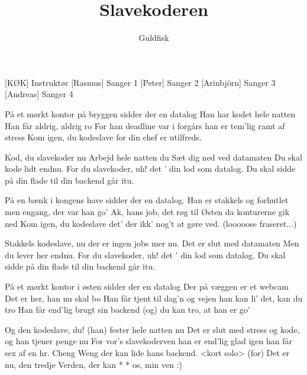 \documentclass[a4paper,11pt]{article}
\title{Slavekoderen}
\author{Guldfisk}
\begin{document}
\maketitle

\begin{roles}
  [KØK] Instruktør
  [Rasmus] Sanger 1
  [Peter] Sanger 2
  [Arinbjörn] Sanger 3
  [Andreas] Sanger 4
\end{roles}

\begin{song}
  På et mørkt kontor på bryggen
  sidder der en datalog
  Han har kodet hele natten
  Han får aldrig, aldrig ro
  For han deadline var i forgårs
  han er tem’lig ramt af stress
  Kom igen, du kodeslave
  for din chef er utilfreds.

  Kod, du slavekoder nu
  Arbejd hele natten du
  Sæt dig ned ved datamaten
  Du skal kode lidt endnu.
  For du slavekoder, uh!
  det ’ din lod som datalog.
  Du skal sidde på din flade
  til din backend går itu.

  På en bænk i kongens have
  sidder der en datalog.
  Han er stakkels og forhutlet
  men engang, der var han go'
  Ak, hans job, det røg til Østen
  da konturerne gik ned
  Kom igen, du kodeslave
  det’ der ikk’ nog’t at gøre ved. (looooose fraseret...)

  Stakkels kodeslave, nu
  der er ingen jobs mer nu.
  Det er slut med datamaten
  Men du lever her endnu.
  For du slavekoder, uh!
  det ’ din lod som datalog.
  Du skal sidde på din flade
  til din backend går itu.

  På et mørkt kontor i østen
  sidder der en datalog
  Der på væggen er et webcam
  Det er her, han nu skal bo
  Han får tjent til dag’n og vejen
  han kan li’ det, kan du tro
  Han får end’lig brugt sin backend
  (og) du kan tro, at han er go’

  Og den kodeslave, du!
  (han) fester hele natten nu
  Det er slut med stress og kode,
  og han tjener penge nu
  For vor's slavekoderven
  han er end’lig glad igen
  han får sex af en hr. Cheng Weng
  der kan lide hans backend.
  <kort solo>
  (for) Det er nu, den tredje Verden,
  der kan * *  os, min ven :)
\end{song}
\end{document}

